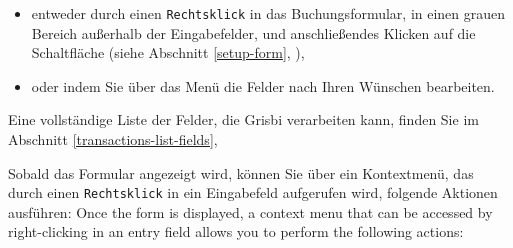 \begin{itemize}
	\item entweder durch einen \texttt{Rechtsklick} in das Buchungsformular, in einen grauen Bereich außerhalb der Eingabefelder, und anschließendes Klicken auf die Schaltfläche  (siehe Abschnitt \vref{setup-form}, ),
	\item oder indem Sie über das Menü  die Felder nach Ihren Wünschen bearbeiten.
\end{itemize}

Eine vollständige Liste der Felder, die Grisbi verarbeiten kann, finden Sie im Abschnitt \vref{transactions-list-fields}, 

Sobald das Formular angezeigt wird, können Sie über ein Kontextmenü, das durch einen \texttt{Rechtsklick} in ein Eingabefeld aufgerufen wird, folgende Aktionen ausführen:
Once the form is displayed, a context menu that can be accessed by right-clicking in an entry field allows you to perform the following actions:

